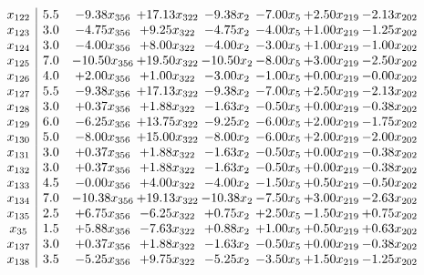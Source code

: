 \documentclass[8pt]{article}
\begin{document}
\[\begin{array}{c| c c@{\hskip 2pt} c@{\hskip 2pt} c@{\hskip 2pt} c@{\hskip 2pt} c@{\hskip 2pt} c@{\hskip 2pt} }
 x_{122}   &  5.5 & -9.38 x_{356} & + 17.13 x_{322} & -9.38 x_{2} & -7.00 x_{5} & +  2.50 x_{219} & -2.13 x_{202}\\
 x_{123}   &  3.0 & -4.75 x_{356} & +  9.25 x_{322} & -4.75 x_{2} & -4.00 x_{5} & +  1.00 x_{219} & -1.25 x_{202}\\
 x_{124}   &  3.0 & -4.00 x_{356} & +  8.00 x_{322} & -4.00 x_{2} & -3.00 x_{5} & +  1.00 x_{219} & -1.00 x_{202}\\
 x_{125}   &  7.0 & -10.50 x_{356} & + 19.50 x_{322} & -10.50 x_{2} & -8.00 x_{5} & +  3.00 x_{219} & -2.50 x_{202}\\
 x_{126}   &  4.0 & +  2.00 x_{356} & +  1.00 x_{322} & -3.00 x_{2} & -1.00 x_{5} & +  0.00 x_{219} & -0.00 x_{202}\\
 x_{127}   &  5.5 & -9.38 x_{356} & + 17.13 x_{322} & -9.38 x_{2} & -7.00 x_{5} & +  2.50 x_{219} & -2.13 x_{202}\\
 x_{128}   &  3.0 & +  0.37 x_{356} & +  1.88 x_{322} & -1.63 x_{2} & -0.50 x_{5} & +  0.00 x_{219} & -0.38 x_{202}\\
 x_{129}   &  6.0 & -6.25 x_{356} & + 13.75 x_{322} & -9.25 x_{2} & -6.00 x_{5} & +  2.00 x_{219} & -1.75 x_{202}\\
 x_{130}   &  5.0 & -8.00 x_{356} & + 15.00 x_{322} & -8.00 x_{2} & -6.00 x_{5} & +  2.00 x_{219} & -2.00 x_{202}\\
 x_{131}   &  3.0 & +  0.37 x_{356} & +  1.88 x_{322} & -1.63 x_{2} & -0.50 x_{5} & +  0.00 x_{219} & -0.38 x_{202}\\
 x_{132}   &  3.0 & +  0.37 x_{356} & +  1.88 x_{322} & -1.63 x_{2} & -0.50 x_{5} & +  0.00 x_{219} & -0.38 x_{202}\\
 x_{133}   &  4.5 & -0.00 x_{356} & +  4.00 x_{322} & -4.00 x_{2} & -1.50 x_{5} & +  0.50 x_{219} & -0.50 x_{202}\\
 x_{134}   &  7.0 & -10.38 x_{356} & + 19.13 x_{322} & -10.38 x_{2} & -7.50 x_{5} & +  3.00 x_{219} & -2.63 x_{202}\\
 x_{135}   &  2.5 & +  6.75 x_{356} & -6.25 x_{322} & +  0.75 x_{2} & +  2.50 x_{5} & -1.50 x_{219} & +  0.75 x_{202}\\
 x_{35}   &  1.5 & +  5.88 x_{356} & -7.63 x_{322} & +  0.88 x_{2} & +  1.00 x_{5} & +  0.50 x_{219} & +  0.63 x_{202}\\
 x_{137}   &  3.0 & +  0.37 x_{356} & +  1.88 x_{322} & -1.63 x_{2} & -0.50 x_{5} & +  0.00 x_{219} & -0.38 x_{202}\\
 x_{138}   &  3.5 & -5.25 x_{356} & +  9.75 x_{322} & -5.25 x_{2} & -3.50 x_{5} & +  1.50 x_{219} & -1.25 x_{202}\\

\end{array}\]
\end{document}
